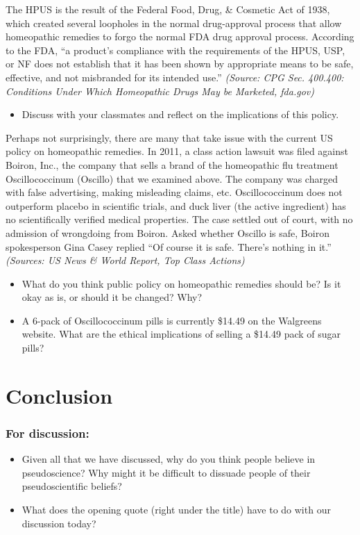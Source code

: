 \documentclass[11pt]{article}
\begin{document}
The HPUS is the result of the Federal Food, Drug, \& Cosmetic Act of 1938, which created several loopholes in the normal drug-approval process that allow homeopathic remedies to forgo the normal FDA drug approval process. According to the FDA, ``a product's compliance with the requirements of the HPUS, USP, or NF does not establish that it has been shown by appropriate means to be safe, effective, and not misbranded for its intended use.'' \textit{(Source: CPG Sec. 400.400: Conditions Under Which Homeopathic Drugs May be Marketed, fda.gov)}

\begin{itemize}
    \item Discuss with your classmates and reflect on the implications of this policy.
\end{itemize}

Perhaps not surprisingly, there are many that take issue with the current US policy on homeopathic remedies. In 2011, a class action lawsuit was filed against Boiron, Inc., the company that sells a brand of the homeopathic flu treatment Oscillococcinum (Oscillo) that we examined above. The company was charged with false advertising, making misleading claims, etc. Oscillococcinum does not outperform placebo in scientific trials, and duck liver (the active ingredient) has no scientifically verified medical properties. The case settled out of court, with no admission of wrongdoing from Boiron. Asked whether Oscillo is safe, Boiron spokesperson Gina Casey replied ``Of course it is safe. There's nothing in it.'' \textit{(Sources: US News \& World Report, Top Class Actions)}

\begin{itemize}
    \item What do you think public policy on homeopathic remedies should be? Is it okay as is, or should it be changed? Why?
    \item A 6-pack of Oscillococcinum pills is currently \$14.49 on the Walgreens website. What are the ethical implications of selling a \$14.49 pack of sugar pills?
\end{itemize}

\section*{Conclusion}

\subsubsection*{For discussion:}
\begin{itemize}
    \item Given all that we have discussed, why do you think people believe in pseudoscience? Why might it be difficult to dissuade people of their pseudoscientific beliefs?
    \item What does the opening quote (right under the title) have to do with our discussion today?
\end{itemize}
\end{document}
